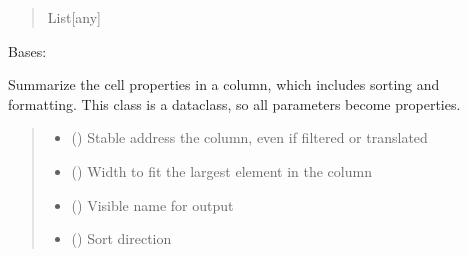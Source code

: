 \documentclass[letterpaper,10pt,english]{sphinxmanual}
\begin{document}
\begin{savenotes}
\begin{fulllineitems}
\begin{savenotes}
\begin{fulllineitems}
\begin{quote}
\begin{description}
\sphinxAtStartPar
List{[}any{]}

\end{description}\end{quote}

\end{fulllineitems}\end{savenotes}


\end{fulllineitems}\end{savenotes}


\begin{savenotes}\begin{fulllineitems}
\label{\detokenize{eezz:eezz.table.TTableColumn}}
\pysigstartsignatures
{}
\pysigstopsignatures
\sphinxAtStartPar
Bases: 

\sphinxAtStartPar
Summarize the cell properties in a column, which includes sorting and formatting.
This class is a dataclass, so all parameters become properties.
\begin{quote}\begin{description}
\begin{itemize}
\item {} 
\sphinxAtStartPar
{} () \textendash{} Stable address the column, even if filtered or translated

\item {} 
\sphinxAtStartPar
{} () \textendash{} Width to fit the largest element in the column

\item {} 
\sphinxAtStartPar
{} () \textendash{} Visible name for output

\item {} 
\sphinxAtStartPar
{} ({\hyperref[\detokenize{eezz:eezz.table.TSort}]{}}) \textendash{} Sort direction


\end{itemize}
\end{description}
\end{quote}
\end{fulllineitems}
\end{savenotes}
\end{document}
